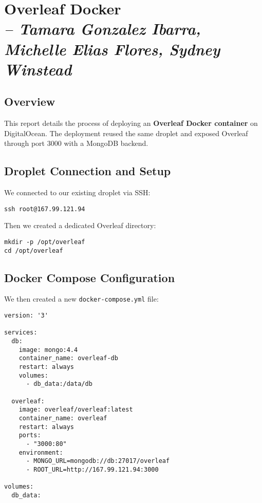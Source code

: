 \chapter{Overleaf Docker \\
\small{\textit{-- Tamara Gonzalez Ibarra, Michelle Elias Flores, Sydney Winstead}}
\label{Chapter::itOverleafDocker}}

\section{Overview}
This report details the process of deploying an \textbf{Overleaf Docker container} on DigitalOcean.  
The deployment reused the same droplet and exposed Overleaf through port 3000 with a MongoDB backend.

\section{Droplet Connection and Setup}

We connected to our existing droplet via SSH:
\begin{verbatim}
ssh root@167.99.121.94
\end{verbatim}

Then we created a dedicated Overleaf directory:
\begin{verbatim}
mkdir -p /opt/overleaf
cd /opt/overleaf
\end{verbatim}

\section{Docker Compose Configuration}

We then created a new \texttt{docker-compose.yml} file:
\begin{verbatim}
version: '3'

services:
  db:
    image: mongo:4.4
    container_name: overleaf-db
    restart: always
    volumes:
      - db_data:/data/db

  overleaf:
    image: overleaf/overleaf:latest
    container_name: overleaf
    restart: always
    ports:
      - "3000:80"
    environment:
      - MONGO_URL=mongodb://db:27017/overleaf
      - ROOT_URL=http://167.99.121.94:3000

volumes:
  db_data:
\end{verbatim}

